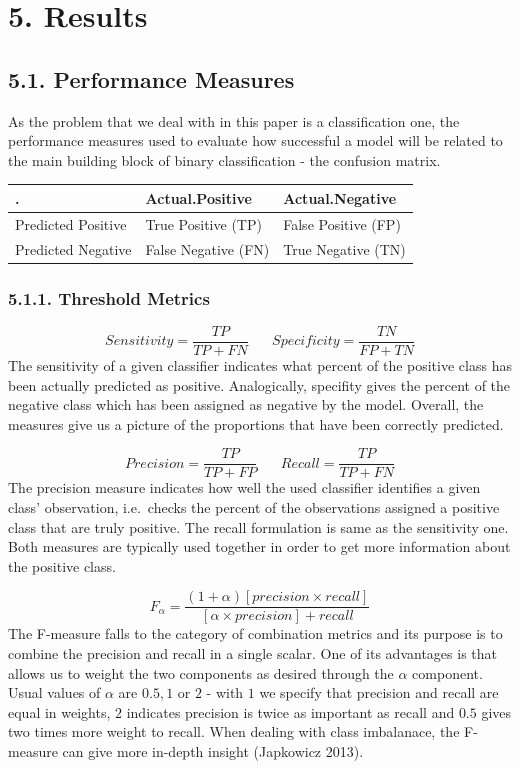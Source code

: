 \documentclass[12pt,]{article}
\begin{document}
\hypertarget{results}{%
\section{5. Results}\label{results}}

\hypertarget{performance-measures}{%
\subsection{5.1. Performance Measures}\label{performance-measures}}

As the problem that we deal with in this paper is a classification one,
the performance measures used to evaluate how successful a model will be
related to the main building block of binary classification - the
confusion matrix.

\begin{longtable}[]{@{}lll@{}}
\toprule
. & Actual.Positive & Actual.Negative\tabularnewline
\midrule
\endhead
Predicted Positive & True Positive (TP) & False Positive
(FP)\tabularnewline
Predicted Negative & False Negative (FN) & True Negative
(TN)\tabularnewline
\bottomrule
\end{longtable}

\hypertarget{threshold-metrics}{%
\subsubsection{5.1.1. Threshold Metrics}\label{threshold-metrics}}

\[Sensitivity = \frac{TP}{TP + FN}\;\;\;\;\;\;Specificity =\frac{TN}{FP+TN} \]
The sensitivity of a given classifier indicates what percent of the
positive class has been actually predicted as positive. Analogically,
specifity gives the percent of the negative class which has been
assigned as negative by the model. Overall, the measures give us a
picture of the proportions that have been correctly predicted.

\[Precision = \frac{TP}{TP+FP}\;\;\;\;\;\;Recall=\frac{TP}{TP+FN}\] The
precision measure indicates how well the used classifier identifies a
given class' observation, i.e.~checks the percent of the observations
assigned a positive class that are truly positive. The recall
formulation is same as the sensitivity one. Both measures are typically
used together in order to get more information about the positive class.

\[F_\alpha=\frac{(1+\alpha)[precision \times recall]}{[\alpha\times precision] + recall}\]
The F-measure falls to the category of combination metrics and its
purpose is to combine the precision and recall in a single scalar. One
of its advantages is that allows us to weight the two components as
desired through the \(\alpha\) component. Usual values of \(\alpha\) are
\(0.5, 1\) or \(2\) - with \(1\) we specify that precision and recall
are equal in weights, \(2\) indicates precision is twice as important as
recall and \(0.5\) gives two times more weight to recall. When dealing
with class imbalanace, the F-measure can give more in-depth insight
(Japkowicz 2013).
\end{document}
